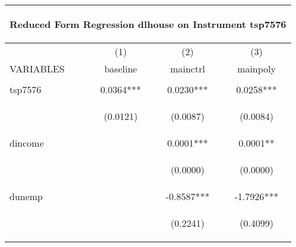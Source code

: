\begin{center}
\begin{tabular}{lccc}
\multicolumn{4}{c}{\begin{large}Reduced Form Regression dlhouse on Instrument tsp7576\end{large}} \\ \hline
 & (1) & (2) & (3) \\
VARIABLES & baseline & mainctrl & mainpoly \\ \hline
\vspace{4pt} & \begin{footnotesize}\end{footnotesize} & \begin{footnotesize}\end{footnotesize} & \begin{footnotesize}\end{footnotesize} \\
tsp7576 & 0.0364*** & 0.0230*** & 0.0258*** \\
\vspace{4pt} & \begin{footnotesize}(0.0121)\end{footnotesize} & \begin{footnotesize}(0.0087)\end{footnotesize} & \begin{footnotesize}(0.0084)\end{footnotesize} \\
dincome &  & 0.0001*** & 0.0001** \\
\vspace{4pt} & \begin{footnotesize}\end{footnotesize} & \begin{footnotesize}(0.0000)\end{footnotesize} & \begin{footnotesize}(0.0000)\end{footnotesize} \\
dunemp &  & -0.8587*** & -1.7926*** \\
\vspace{4pt} & \begin{footnotesize}\end{footnotesize} & \begin{footnotesize}(0.2241)\end{footnotesize} & \begin{footnotesize}(0.4099)\end{footnotesize} \\

\end{tabular}
\end{center}
